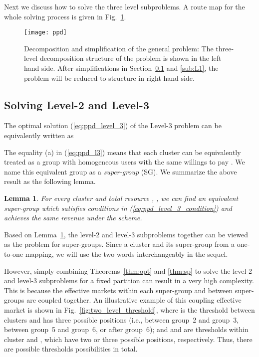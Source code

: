 \documentclass[twocolumn,10pt,twosided]{IEEEtran}
\newtheorem{lemma}{Lemma}
\begin{document}
Next we discuss how to solve the three level subproblems. A route map for the whole solving process is given in Fig.~\ref{fig:PPD}.

\begin{figure}[ht]
\centering
\texttt{[image: ppd]}
\caption{Decomposition and simplification of the general  problem: The three-level decomposition structure of the  problem is shown in the left hand side. After simplifications in Section~\ref{sub_L2L3} and \ref{sub:L1}, the problem will be reduced to structure in right hand side.}
\label{fig:PPD}
\end{figure}


\subsection{Solving Level-2 and Level-3}
\label{sub_L2L3}
The optimal solution  (\ref{eq:ppd_level_3}) of the Level-3 problem  can be equivalently written as


The equality (a) in (\ref{eq:ppd_l3}) means that each cluster   can be equivalently treated as a group with  homogeneous users with the same willings to pay . We name this equivalent group as a \emph{super-group} (SG). We summarize the above result as the following lemma.

\begin{lemma}
\label{le:sp}
For every cluster  and total resource , , we can find an equivalent super-group which satisfies conditions in (\ref{eq:ppd_level_3_condition}) and achieves the same revenue under the  scheme.
\end{lemma}

Based on Lemma~\ref{le:sp}, the level-2 and level-3 subproblems together can be viewed as the  problem for super-groups. Since a cluster and its super-group from a one-to-one mapping, we will use the two words interchangeably in the sequel.

However, simply combining Theorems~\ref{thm:opt} and \ref{thm:sp} to solve the level-2 and level-3 subproblems for a fixed partition  can result in a very high complexity.  This is because the effective markets within each super-group and between super-groups are coupled together. An illustrative  example of this coupling effective market is shown in Fig.~\ref{fig:two_level_threshold}, where  is the threshold between clusters and has three possible positions (i.e., between group~2 and group~3, between group~5 and group~6, or after group~6); and  and  are thresholds within cluster  and  , which have two or three possible positions, respectively. Thus, there are  possible thresholds possibilities in total.
\end{document}
